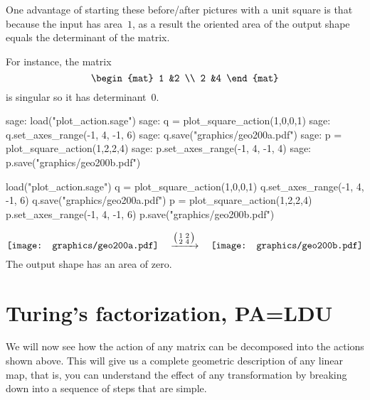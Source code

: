 One advantage of starting these before/after pictures with a unit
square is that because the input has area~$1$, as a result
the oriented area of the output shape equals the
determinant of the matrix. 

For instance, the matrix
\begin{equation*}
\begin{mat}
  1 &2 \\
  2 &4
\end{mat}
\end{equation*}
is singular so it has determinant~$0$.
\begin{sagecommandline}
sage: load("plot_action.sage")
sage: q = plot_square_action(1,0,0,1) 
sage: q.set_axes_range(-1, 4, -1, 6) 
sage: q.save("graphics/geo200a.pdf")
sage: p = plot_square_action(1,2,2,4) 
sage: p.set_axes_range(-1, 4, -1, 4) 
sage: p.save("graphics/geo200b.pdf")
\end{sagecommandline}
\begin{sagesilent}
load("plot_action.sage")
q = plot_square_action(1,0,0,1) 
q.set_axes_range(-1, 4, -1, 6) 
q.save("graphics/geo200a.pdf")
p = plot_square_action(1,2,2,4) 
p.set_axes_range(-1, 4, -1, 6) 
p.save("graphics/geo200b.pdf")
\end{sagesilent}
\begin{equation*}
  \vcenteredhbox{\texttt{[image: graphics/geo200a.pdf]}}
  \quad\mapsvia{\big (\begin{smallmatrix} 1 &2 \\ 2 &4 \end{smallmatrix}\big )}\quad
  \vcenteredhbox{\texttt{[image: graphics/geo200b.pdf]}}
\end{equation*}
The output shape has an area of zero.






\section{Turing's factorization, PA=LDU}
We will now see how the action of any matrix can be decomposed into 
the actions shown above.
This will give us a complete geometric description of any linear map,
that is, you can understand the effect of any transformation by 
breaking down into a sequence of steps that are simple.

